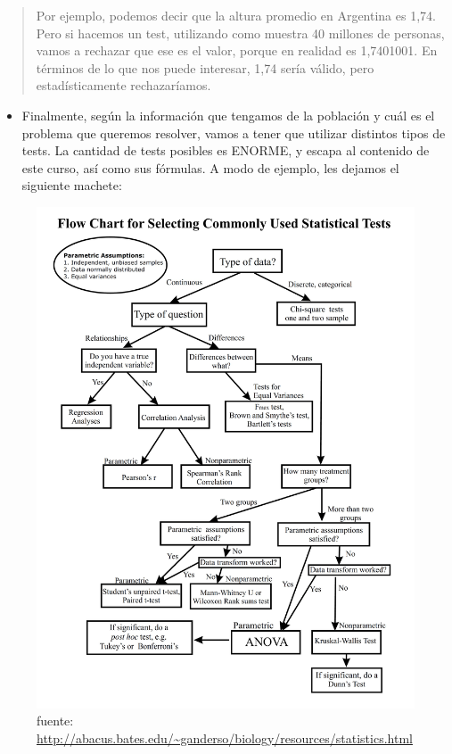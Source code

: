 \documentclass[]{book}
\providecommand{\tightlist}{%
  \setlength{\itemsep}{0pt}\setlength{\parskip}{0pt}}
\begin{document}
\begin{quote}
Por ejemplo, podemos decir que la altura promedio en Argentina es 1,74. Pero si hacemos un test, utilizando como muestra 40 millones de personas, vamos a rechazar que ese es el valor, porque en realidad es 1,7401001. En términos de lo que nos puede interesar, 1,74 sería válido, pero estadísticamente rechazaríamos.
\end{quote}

\begin{itemize}
\tightlist
\item
  Finalmente, según la información que tengamos de la población y cuál es el problema que queremos resolver, vamos a tener que utilizar distintos tipos de tests. La cantidad de tests posibles es ENORME, y escapa al contenido de este curso, así como sus fórmulas. A modo de ejemplo, les dejamos el siguiente machete:
\end{itemize}

\begin{figure}
\centering
\includegraphics[width=10.41667in,height=\textheight]{img/tests.jpeg}
\caption{fuente: \url{http://abacus.bates.edu/~ganderso/biology/resources/statistics.html}}
\end{figure}
\end{document}
